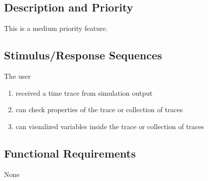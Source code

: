 \subsection{Description and Priority}
This is a medium priority feature.

\subsection{Stimulus/Response Sequences}
The user
\begin{enumerate}
\item received a time trace from simulation output
\item can check properties of the trace or collection of traces
\item can visualized variables inside the trace or collection of traces
\end{enumerate}


\subsection{Functional Requirements}

None


